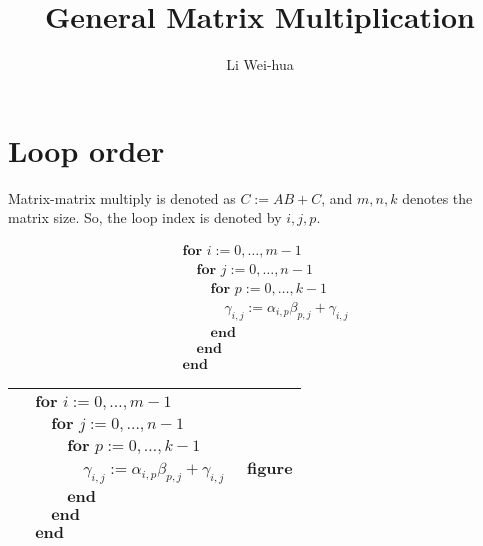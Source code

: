 \documentclass[a4paper,12pt]{article}
\title{General Matrix Multiplication}
\author{Li Wei-hua}
\begin{document}
\maketitle

\section{Loop order}
Matrix-matrix multiply is denoted as $C := AB + C$, and $m, n, k$ denotes the matrix size.
So, the loop index is denoted by $i, j, p$.

\begin{align*}
&\textbf{for~} i := 0, \ldots , m-1 \\
&\hspace{1em} \textbf{for~} j := 0, \ldots , n-1 \\
&\hspace{2em} \textbf{for~} p := 0, \ldots , k-1 \\
&\hspace{3em} \gamma_{i,j} := \alpha_{i,p} \beta_{p,j} + \gamma_{i,j} \\
&\hspace{2em} \textbf{end} \\
&\hspace{1em} \textbf{end} \\
&\textbf{end}
\end{align*}


\begin{center}
\begin{tabular}{|l|c|}
\hline
{$\!\begin{aligned}
&\textbf{for~} i := 0, \ldots , m-1 \\
&\hspace{1em} \textbf{for~} j := 0, \ldots , n-1 \\
&\hspace{2em} \textbf{for~} p := 0, \ldots , k-1 \\
&\hspace{3em} \gamma_{i,j} := \alpha_{i,p} \beta_{p,j} + \gamma_{i,j} \\
&\hspace{2em} \textbf{end} \\
&\hspace{1em} \textbf{end} \\
&\textbf{end}
\end{aligned}$}
& figure \\
\hline
\end{tabular}
\end{center}
\end{document}
